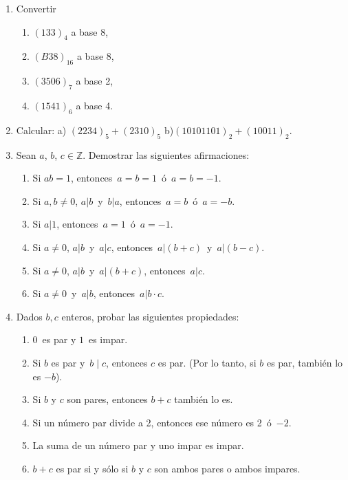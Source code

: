 \documentclass[a4paper,12pt,twoside,spanish,reqno]{amsbook}
\numberwithin{equation}{section}
\begin{document}
\begin{enumerate}
\item Convertir
\begin{multicols}{2}
\begin{enumerate}
    \item  $(133)_4$ a base 8,
    \item  $(B38)_{16}$ a base 8,
    \item  $(3506)_7$ a base 2,
    \item  $(1541)_6$ a base 4.
\end{enumerate}
\end{multicols}


\item Calcular: a) $(2234)_5+(2310)_5$ \qquad \qquad b)$(10101101)_2+(10011)_2$.


\item Sean $a$, $b$, $c \in {\mathbb Z}$. Demostrar las siguientes afirmaciones:
  \begin{enumerate}
  \item Si $ab=1$, entonces \,$a=b=1$\, ó \,$a=b=-1$.
  \item Si $a,b \neq 0$,  $a| b$\, y \,$b | a$, entonces \,$a=b$\, ó \,$a=-b$.
  \item Si $a | 1$, entonces \,$a=1$\, ó \,$a=-1$.
  \item Si $a \neq 0$, $a | b$\, y \,$a | c$, entonces \,$a | (b+c)$\, y \,$a | (b-c)$.
  \item Si $a \neq 0$, $a | b$\, y \,$a | (b+c)$, entonces \,$a | c$.
  \item Si $a \neq 0$\, y \,$a | b$, entonces \,$a| b\cdot c$.
  \end{enumerate}


\item Dados $b,c$ enteros, probar las siguientes propiedades:
  \begin{enumerate}
  \item  $0$\, es par y $1$\, es impar.
  \item  Si $b$ es par y \,$b \mid c$, entonces $c$ es par.  (Por lo tanto, si $b$ es par, también lo es $-b$).
  \item  Si $b$ y $c$ son pares, entonces $b+c$ también lo es. %
  \item  Si un número par divide a 2, entonces ese número es 2\, ó \,$-2$.
  \item  La suma de un número par y uno impar es impar.
  \item $b + c$ es par si y  sólo si $b$ y $c$ son ambos pares o ambos impares.
\end{enumerate}



\end{enumerate}
\end{document}
